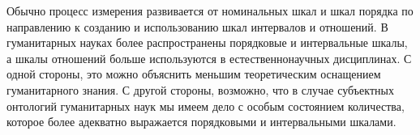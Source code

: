 Обычно процесс измерения развивается от номинальных шкал и шкал порядка по направлению
к созданию и использованию шкал интервалов и отношений.
В гуманитарных науках более распространены порядковые и интервальные шкалы,
а шкалы отношений больше используются в естественнонаучных дисциплинах.
С одной стороны, это можно объяснить меньшим теоретическим оснащением гуманитарного знания.
С другой стороны, возможно, что в случае субъектных онтологий гуманитарных наук мы имеем дело
с особым состоянием количества, которое более адекватно выражается порядковыми и интервальными шкалами.
